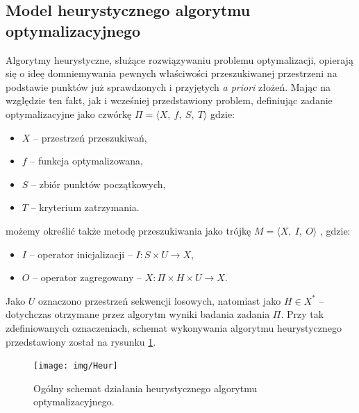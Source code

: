 \documentclass[12pt,a4paper]{report}
\begin{document}
{\subsection{Model heurystycznego algorytmu optymalizacyjnego}
\label{Model}
\par{
Algorytmy heurystyczne, służące rozwiązywaniu problemu optymalizacji, opierają się o ideę domniemywania pewnych właściwości przeszukiwanej przestrzeni na podstawie punktów już sprawdzonych i przyjętych \emph{a priori} złożeń. Mając na względzie ten fakt, jak i wcześniej przedstawiony problem, definiując \cite{SearchingInteligent} zadanie optymalizacyjne jako czwórkę $\Pi = \langle{}X,~f,~S,~T\rangle$ gdzie:
\begin{itemize}
\item $X$ -- przestrzeń przeszukiwań,
\item $f$ -- funkcja optymalizowana,
\item $S$ -- zbiór punktów początkowych,
\item $T$ -- kryterium zatrzymania.
\end{itemize}
możemy określić także metodę przeszukiwania jako trójkę $M = \langle{}X,~I,~O\rangle$ \cite{SearchingInteligent}, gdzie:
\begin{itemize}
\item $I$ -- operator inicjalizacji -- $I: S \times U \rightarrow X$,
\item $O$ -- operator zagregowany -- $X: \Pi \times H \times U \rightarrow X$.
\end{itemize}
Jako $U$ oznaczono przestrzeń sekwencji losowych, natomiast jako $H \in X^*$ -- dotychczas otrzymane przez algorytm wyniki badania zadania $\Pi$. Przy tak zdefiniowanych oznaczeniach, schemat wykonywania algorytmu heurystycznego przedstawiony został na rysunku \ref{HeurSchema}.
}

\begin{figure}[htb]
\begin{center}\texttt{[image: img/Heur]}\end{center}
\caption{Ogólny schemat działania heurystycznego algorytmu optymalizacyjnego.}
\label{HeurSchema}
\end{figure}


}
\end{document}
